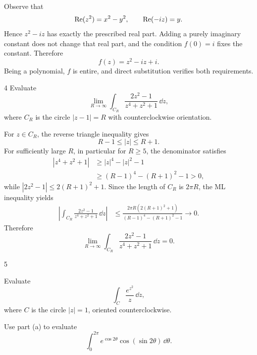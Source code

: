 \documentclass[11pt,oneside]{article}
\begin{document}
\begin{solution}[2]
Observe that
\[
    \operatorname{Re}(z^2)=x^2-y^2, \qquad
    \operatorname{Re}(-iz)=y.
\]
Hence $z^2-iz$ has exactly the prescribed real part. Adding a purely imaginary constant does not change that real part, and the condition $f(0)=i$ fixes the constant. Therefore
\[
    \boxed{f(z)=z^2-iz+i.}
\]
Being a polynomial, $f$ is entire, and direct substitution verifies both requirements.
\end{solution}

\begin{problem}{4}
Evaluate
\[
    \lim_{R\to\infty}\int_{C_R}
    \frac{2z^2-1}{z^4+z^2+1}\,\dd z,
\]
where $C_R$ is the circle $|z-1|=R$ with counterclockwise orientation.
\end{problem}

\begin{solution}
For $z\in C_R$, the reverse triangle inequality gives
\[
    R-1\le|z|\le R+1.
\]
For sufficiently large $R$, in particular for $R\ge5$, the denominator satisfies
\[
\begin{aligned}
    |z^4+z^2+1|
    &\ge |z|^4-|z|^2-1\\
    &\ge (R-1)^4-(R+1)^2-1>0,
\end{aligned}
\]
while $|2z^2-1|\le 2(R+1)^2+1$. Since the length of $C_R$ is $2\pi R$, the ML inequality yields
\[
\begin{aligned}
    \left|\int_{C_R}\frac{2z^2-1}{z^4+z^2+1}\,\dd z\right|
    &\le\frac{2\pi R(2(R+1)^2+1)}{(R-1)^4-(R+1)^2-1}
    \longrightarrow0.
\end{aligned}
\]
Therefore
\[
    \boxed{\lim_{R\to\infty}\int_{C_R}
    \frac{2z^2-1}{z^4+z^2+1}\,\dd z=0.}
\]
\end{solution}

\begin{problem}{5}
\begin{problemsubparts}
    \item Evaluate
    \[
        \int_C\frac{e^{z^2}}{z}\,\dd z,
    \]
    where $C$ is the circle $|z|=1$, oriented counterclockwise.
    \item Use part (a) to evaluate
    \[
        \int_0^{2\pi}e^{\cos 2\theta}\cos(\sin 2\theta)\,\dd\theta.
    \]
\end{problemsubparts}
\end{problem}
\end{document}
